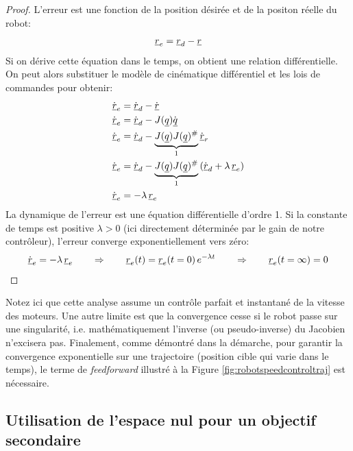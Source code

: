 \begin{proof}
L'erreur est une fonction de la position désirée et de la positon réelle du robot:
\begin{align}
\underline{r}_e = \underline{r}_d - \underline{r}
\end{align}
Si on dérive cette équation dans le temps, on obtient une relation différentielle. On peut alors substituer le modèle de cinématique différentiel et les lois de commandes pour obtenir:
\begin{align}
\dot{\underline{r}}_e  &= \dot{\underline{r}}_d - \dot{\underline{r}} \\
\dot{\underline{r}}_e  &= \dot{\underline{r}}_d - J(\underline{q}) \dot{\underline{q}} \\
\dot{\underline{r}}_e  &= \dot{\underline{r}}_d - \underbrace{J(\underline{q}) J(\underline{q})^{\#} }_{1} \dot{\underline{r}}_r \\
\dot{\underline{r}}_e  &= \dot{\underline{r}}_d - \underbrace{J(\underline{q}) J(\underline{q})^{\#} }_{1}  \left( \dot{\underline{r}}_d + \lambda \, \underline{r}_e \right) \\
\dot{\underline{r}}_e  &= - \lambda \, \underline{r}_e  
\end{align}
La dynamique de l'erreur est une équation différentielle d'ordre 1. Si la constante de temps est positive $\lambda>0$ (ici directement déterminée par le gain de notre contrôleur), l'erreur converge exponentiellement vers zéro:
\begin{align}
\dot{\underline{r}}_e = - \lambda \, \underline{r}_e 
\quad\quad \Rightarrow \quad\quad 
\underline{r}_e(t) = \underline{r}_e(t=0) \, e^{- \lambda t} 
\quad\quad \Rightarrow \quad\quad 
\underline{r}_e(t=\infty) = 0
\end{align}
\end{proof}
Notez ici que cette analyse assume un contrôle parfait et instantané de la vitesse des moteurs. Une autre limite est que la convergence cesse si le robot passe sur une singularité, i.e. mathématiquement l'inverse (ou pseudo-inverse) du Jacobien n'excisera pas. Finalement, comme démontré dans la démarche, pour garantir la convergence exponentielle sur une trajectoire (position cible qui varie dans le temps), le terme de \textit{feedforward} illustré à la Figure \ref{fig:robotspeedcontroltraj} est nécessaire.




\newpage
\subsection{Utilisation de l'espace nul pour un objectif secondaire}

